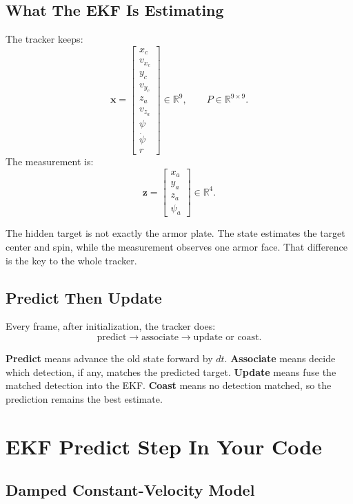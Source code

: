\documentclass[11pt,a4paper]{article}
\newcommand{\vect}[1]{\bm{#1}}
\newcommand{\R}{\mathbb{R}}
\begin{document}
\subsection{What The EKF Is Estimating}

The tracker keeps:
\[
\vect{x} =
\begin{bmatrix}
x_c\\v_{x_c}\\y_c\\v_{y_c}\\z_a\\v_{z_a}\\\psi\\\dot{\psi}\\r
\end{bmatrix}
\in \R^9,
\qquad
P\in\R^{9\times 9}.
\]
The measurement is:
\[
\vect{z} =
\begin{bmatrix}
x_a\\y_a\\z_a\\\psi_a
\end{bmatrix}
\in \R^4.
\]

The hidden target is not exactly the armor plate.
The state estimates the target center and spin, while the measurement observes one armor face.
That difference is the key to the whole tracker.

\subsection{Predict Then Update}

Every frame, after initialization, the tracker does:
\[
\text{predict} \rightarrow \text{associate} \rightarrow \text{update or coast}.
\]

\textbf{Predict} means advance the old state forward by \(dt\).
\textbf{Associate} means decide which detection, if any, matches the predicted target.
\textbf{Update} means fuse the matched detection into the EKF.
\textbf{Coast} means no detection matched, so the prediction remains the best estimate.

\section{EKF Predict Step In Your Code}

\subsection{Damped Constant-Velocity Model}
\end{document}
